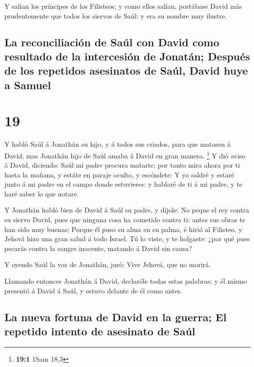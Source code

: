  Y salían los príncipes de los Filisteos; y como ellos
salían, portábase David más prudentemente que todos los siervos de Saúl:
y era su nombre muy ilustre.

\hypertarget{la-reconciliaciuxf3n-de-sauxfal-con-david-como-resultado-de-la-intercesiuxf3n-de-jonatuxe1n-despuuxe9s-de-los-repetidos-asesinatos-de-sauxfal-david-huye-a-samuel}{%
\subsection{La reconciliación de Saúl con David como resultado de la
intercesión de Jonatán; Después de los repetidos asesinatos de Saúl,
David huye a
Samuel}\label{la-reconciliaciuxf3n-de-sauxfal-con-david-como-resultado-de-la-intercesiuxf3n-de-jonatuxe1n-despuuxe9s-de-los-repetidos-asesinatos-de-sauxfal-david-huye-a-samuel}}

\hypertarget{section-18}{%
\section{19}\label{section-18}}

 Y habló Saúl á Jonathán su hijo, y á todos sus criados,
para que matasen á David; mas Jonathán hijo de Saúl amaba á David en
gran manera. \footnote{\textbf{19:1} 1Sam 18,3}  Y dió
aviso á David, diciendo: Saúl mi padre procura matarte; por tanto mira
ahora por ti hasta la mañana, y estáte en paraje oculto, y escóndete:
 Y yo saldré y estaré junto á mi padre en el campo donde
estuvieres: y hablaré de ti á mi padre, y te haré saber lo que notare.

 Y Jonathán habló bien de David á Saúl su padre, y díjole:
No peque el rey contra su siervo David, pues que ninguna cosa ha
cometido contra ti: antes sus obras te han sido muy buenas;
 Porque él puso su alma en su palma, é hirió al Filisteo,
y Jehová hizo una gran salud á todo Israel. Tú lo viste, y te holgaste:
¿por qué pues pecarás contra la sangre inocente, matando á David sin
causa?

 Y oyendo Saúl la voz de Jonathán, juró: Vive Jehová, que
no morirá.

 Llamando entonces Jonathán á David, declaróle todas estas
palabras; y él mismo presentó á David á Saúl, y estuvo delante de él
como antes.

\hypertarget{la-nueva-fortuna-de-david-en-la-guerra-el-repetido-intento-de-asesinato-de-sauxfal}{%
\subsection{La nueva fortuna de David en la guerra; El repetido intento
de asesinato de
Saúl}\label{la-nueva-fortuna-de-david-en-la-guerra-el-repetido-intento-de-asesinato-de-sauxfal}}

